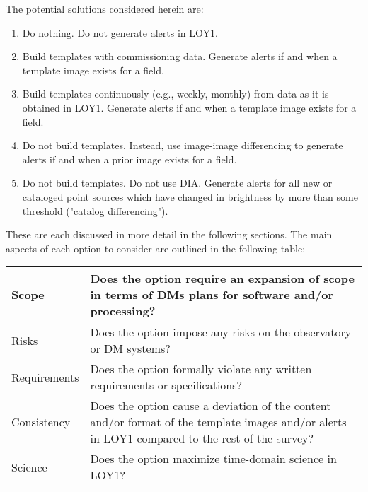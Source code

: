\documentclass[DM,lsstdraft,toc]{lsstdoc}
\begin{document}
The potential solutions considered herein are:
\begin{enumerate}
\item Do nothing. Do not generate alerts in LOY1.
\item Build templates with commissioning data. Generate alerts if and when a template image exists for a field. 
\item Build templates continuously (e.g., weekly, monthly) from data as it is obtained in LOY1. Generate alerts if and when a template image exists for a field.
\item Do not build templates. Instead, use image-image differencing to generate alerts if and when a prior image exists for a field.
\item Do not build templates. Do not use DIA. Generate alerts for all new or cataloged point sources which have changed in brightness by more than some threshold ("catalog differencing").
\end{enumerate}

These are each discussed in more detail in the following sections. The main aspects of each option to consider are outlined in the following table:
\begin{center}
\begin{tabular}{|p{2.5cm}|p{13cm}|}
\hline
Scope & Does the option require an expansion of scope in terms of DMs plans for software and/or processing? \\
\hline
Risks & Does the option impose any risks on the observatory or DM systems?  \\
\hline
Requirements & Does the option formally violate any written requirements or specifications? \\
\hline
Consistency & Does the option cause a deviation of the content and/or format of the template images and/or alerts in LOY1 compared to the rest of the survey? \\ %
\hline
Science & Does the option maximize time-domain science in LOY1? \\
\hline
\end{tabular}
\end{center} 
\end{document}
